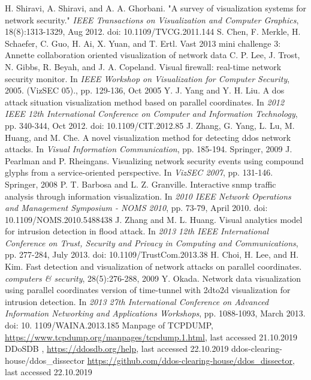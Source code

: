 \begin{thebibliography}{99}
 H. Shiravi, A. Shiravi, and A. A. Ghorbani. "A survey of visualization systems for network security." \textit{IEEE Transactions on Visualization and Computer Graphics}, 18(8):1313-1329, Aug 2012. doi: 10.1109/TVCG.2011.144
 S. Chen, F. Merkle, H. Schaefer, C. Guo, H. Ai, X. Yuan, and T. Ertl. Vast 2013 mini challenge 3: Annette collaboration oriented visualization of network data
 C. P. Lee, J. Trost, N. Gibbs, R. Beyah, and J. A. Copeland. Visual firewall: real-time network security monitor. In \textit{IEEE Workshop on Visualization for Computer Security}, 2005. (VizSEC 05)., pp. 129-136, Oct 2005
 Y. J. Yang and Y. H. Liu. A dos attack situation visualization method based on parallel coordinates. In \textit{2012 IEEE 12th International Conference on Computer and Information Technology}, pp. 340-344, Oct 2012. doi: 10.1109/CIT.2012.85
 J. Zhang, G. Yang, L. Lu, M. Huang, and M. Che. A novel visualization method for detecting ddos network attacks. In \textit{Visual Information Communication}, pp. 185-194. Springer, 2009
 J. Pearlman and P. Rheingans. Visualizing network security events using compound glyphs from a service-oriented perspective. In \textit{VizSEC 2007}, pp. 131-146. Springer, 2008
 P. T. Barbosa and L. Z. Granville. Interactive snmp traffic analysis through information visualization. In \textit{2010 IEEE Network Operations and Management Symposium - NOMS 2010}, pp. 73-79, April 2010. doi: 10.1109/NOMS.2010.5488438
 J. Zhang and M. L. Huang. Visual analytics model for intrusion detection in flood attack. In \textit{2013 12th IEEE International Conference on Trust, Security and Privacy in Computing and Communications}, pp. 277-284, July 2013. doi: 10.1109/TrustCom.2013.38
 H. Choi, H. Lee, and H. Kim. Fast detection and visualization of network attacks on parallel coordinates. \textit{computers \& security}, 28(5):276-288, 2009
 Y. Okada. Network data visualization using parallel coordinates version of time-tunnel with 2dto2d visualization for intrusion detection. In \textit{2013 27th International Conference on Advanced Information Networking and Applications Workshops}, pp. 1088-1093, March 2013. doi: 10. 1109/WAINA.2013.185
Manpage of TCPDUMP, \url{https://www.tcpdump.org/manpages/tcpdump.1.html}, last accessed 21.10.2019
 DDoSDB , \url{https://ddosdb.org/help}, last accessed 22.10.2019
 ddos-clearing-house/ddos\_dissector \url{https://github.com/ddos-clearing-house/ddos_dissector}, last accessed 22.10.2019

\end{thebibliography}
